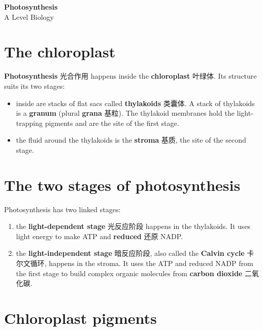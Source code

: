 \documentclass[11pt]{article}
\begin{document}
\begin{center}
  {\LARGE\bfseries Photosynthesis}\\[0.35em]
  {\large A Level Biology}
\end{center}
\vspace{0.6em}

\section*{The chloroplast}

\textbf{Photosynthesis} 光合作用 happens inside the \textbf{chloroplast} 叶绿体. Its structure suits its two stages:

\begin{itemize}
\item inside are stacks of flat sacs called \textbf{thylakoids} 类囊体. A stack of thylakoids is a \textbf{granum} (plural \textbf{grana} 基粒). The thylakoid membranes hold the light-trapping pigments and are the site of the first stage.

\item the fluid around the thylakoids is the \textbf{stroma} 基质, the site of the second stage.

\end{itemize}

\section*{The two stages of photosynthesis}

Photosynthesis has two linked stages:

\begin{enumerate}
\item the \textbf{light-dependent stage} 光反应阶段 happens in the thylakoids. It uses light energy to make ATP and \textbf{reduced} 还原 NADP.

\item the \textbf{light-independent stage} 暗反应阶段, also called the \textbf{Calvin cycle} 卡尔文循环, happens in the stroma. It uses the ATP and reduced NADP from the first stage to build complex organic molecules from \textbf{carbon dioxide} 二氧化碳.

\end{enumerate}

\section*{Chloroplast pigments}
\end{document}
